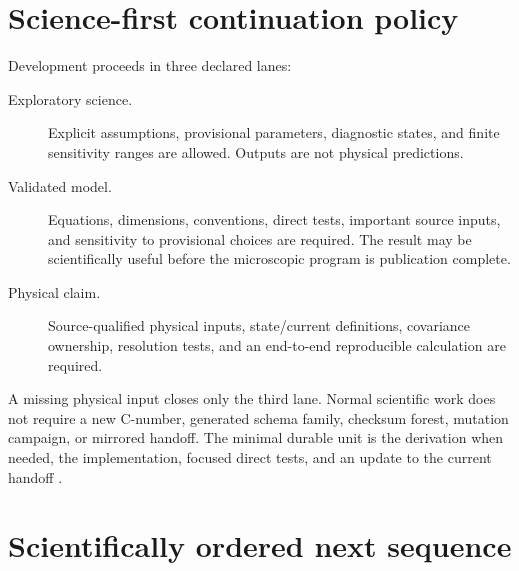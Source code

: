 \documentclass[11pt,oneside]{book}
\begin{document}
\section{Science-first continuation policy}

Development proceeds in three declared lanes:
\begin{description}
 \item[Exploratory science.] Explicit assumptions, provisional parameters, diagnostic states, and finite sensitivity ranges are allowed.  Outputs are not physical predictions.
 \item[Validated model.] Equations, dimensions, conventions, direct tests, important source inputs, and sensitivity to provisional choices are required.  The result may be scientifically useful before the microscopic program is publication complete.
 \item[Physical claim.] Source-qualified physical inputs, state/current definitions, covariance ownership, resolution tests, and an end-to-end reproducible calculation are required.
\end{description}
A missing physical input closes only the third lane.  Normal scientific work does not require a new C-number, generated schema family, checksum forest, mutation campaign, or mirrored handoff.  The minimal durable unit is the derivation when needed, the implementation, focused direct tests, and an update to the current handoff \cite{DWCurrentHandoff2026}.

\section{Scientifically ordered next sequence}
\end{document}
